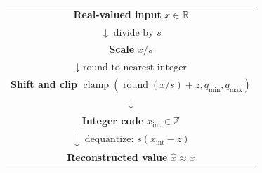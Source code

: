 \begin{center}
\setlength{\fboxsep}{6pt}
\begin{tabular}{c}
    \fbox{\parbox[c][0.82cm][c]{0.55\textwidth}{\centering
        \textbf{Real-valued input}\\
        \(x\in\mathbb{R}\)}}\\[0.25em]
    \(\downarrow\;\text{divide by }s\)\\[0.2em]
    \fbox{\parbox[c][0.82cm][c]{0.55\textwidth}{\centering
        \textbf{Scale}\\
        \(x/s\)}}\\[0.25em]
    \(\downarrow\;\text{round to nearest integer}\)\\[0.2em]
    \fbox{\parbox[c][0.82cm][c]{0.55\textwidth}{\centering
        \textbf{Shift and clip}\\
        \(\operatorname{clamp}(\operatorname{round}(x/s)+z,
        q_{\min},q_{\max})\)}}\\[0.25em]
    \(\downarrow\)\\[0.2em]
    \fbox{\parbox[c][0.82cm][c]{0.55\textwidth}{\centering
        \textbf{Integer code}\\
        \(x_{\mathrm{int}}\in\mathbb{Z}\)}}\\[0.25em]
    \(\downarrow\;\text{dequantize: }s(x_{\mathrm{int}}-z)\)\\[0.2em]
    \fbox{\parbox[c][0.82cm][c]{0.55\textwidth}{\centering
        \textbf{Reconstructed value}\\
        \(\widehat{x}\approx x\)}}\\
\end{tabular}
\end{center}
